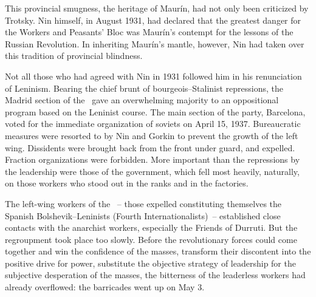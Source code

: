 This provincial smugness, the heritage of Maur\'in, had not only been criticized by Trotsky. Nin himself, in August 1931, had declared that the greatest danger for the Workers and Peasants' Bloc was Maur\'in’s contempt for the lessons of the Russian Revolution. In inheriting Maur\'in’s mantle, however, Nin had taken over this tradition of provincial blindness.

Not all those who had agreed with Nin in 1931 followed him in his renunciation of Leninism. Bearing the chief brunt of bourgeois--Stalinist repressions, the Madrid section of the \POUM\ gave an overwhelming majority to an oppositional program based on the Leninist course. The main section of the party, Barcelona, voted for the immediate organization of soviets on April 15, 1937. Bureaucratic measures were resorted to by Nin and Gorkin to prevent the growth of the left wing. Dissidents were brought back from the front under guard, and expelled. Fraction organizations were forbidden. More important than the repressions by the leadership were those of the government, which fell most heavily, naturally, on those workers who stood out in the ranks and in the factories.

The left-wing workers of the \POUM~-- those expelled constituting themselves the Spanish Bolshevik--Leninists (Fourth Internationalists)~-- established close contacts with the anarchist workers, especially the Friends of Durruti. But the regroupment took place too slowly. Before the revolutionary forces could come together and win the confidence of the masses, transform their discontent into the positive drive for power, substitute the objective strategy of leadership for the subjective desperation of the masses, the bitterness of the leaderless workers had already overflowed: the barricades went up on May 3.